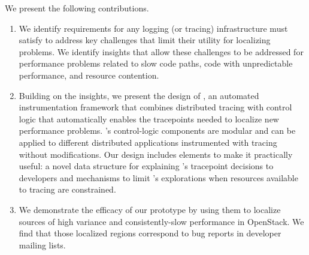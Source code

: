 We present the following contributions.
%
\begin{enumerate}[leftmargin=*]
  \itemsep 0pt
   \item We identify requirements for any logging (or tracing)
   infrastructure must satisfy to address key challenges that limit
   their utility for localizing problems.  We identify insights that
   allow these challenges to be addressed for performance problems
   related to slow code paths, code with unpredictable performance,
   and resource contention.
     
   \item Building on the insights, we present the design of \STAIF{},
     an automated instrumentation framework that combines distributed
     tracing with control logic that automatically enables the
     tracepoints needed to localize new performance problems.
     \STAIF{}'s control-logic components are modular and can be
     applied to different distributed applications instrumented with
     tracing without modifications.  Our \STAIF{} design includes elements
     to make it practically useful: a novel data structure for
     explaining \STAIF{}'s tracepoint decisions to developers and
     mechanisms to limit \STAIF{}'s explorations when resources
     available to tracing are constrained.

   \item We demonstrate the efficacy of our \STAIF{}
     prototype by using them to localize sources of high
     variance and consistently-slow performance in OpenStack.
    We find that those localized regions correspond to bug reports in developer mailing lists.


\end{enumerate}
